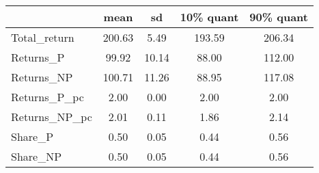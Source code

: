 \begin{tabular}{lcccc}
\toprule
{} &    mean &     sd &  10\% quant &  90\% quant \\
\midrule
Total\_return  &  200.63 &   5.49 &     193.59 &     206.34 \\
Returns\_P     &   99.92 &  10.14 &      88.00 &     112.00 \\
Returns\_NP    &  100.71 &  11.26 &      88.95 &     117.08 \\
Returns\_P\_pc  &    2.00 &   0.00 &       2.00 &       2.00 \\
Returns\_NP\_pc &    2.01 &   0.11 &       1.86 &       2.14 \\
Share\_P       &    0.50 &   0.05 &       0.44 &       0.56 \\
Share\_NP      &    0.50 &   0.05 &       0.44 &       0.56 \\
\bottomrule
\end{tabular}
